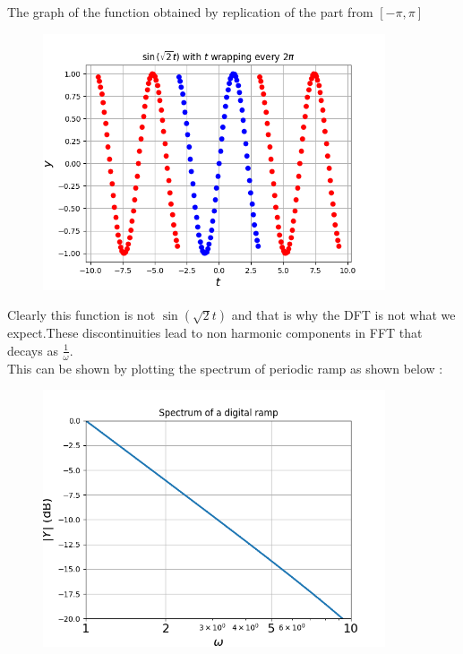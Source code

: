 \documentclass[10pt,a4paper]{article}
\begin{document}
The graph of the function obtained by replication of the part from $[-\pi, \pi]$

\begin{figure}[!tbh]

\includegraphics[width = 0.9\textwidth]{1-time function by replication of the part.png}

\end{figure}

Clearly this function is not $\sin( \sqrt{2}t)$ and that is why the DFT is not what we expect.These discontinuities lead to non harmonic components in FFT that decays as $\frac{1}{\omega}$.\\ This can be shown by plotting the spectrum of periodic ramp as shown below :

\begin{figure}[!tbh]

\includegraphics[width = 0.9\textwidth]{1-ramp.png}

\end{figure}
\end{document}
